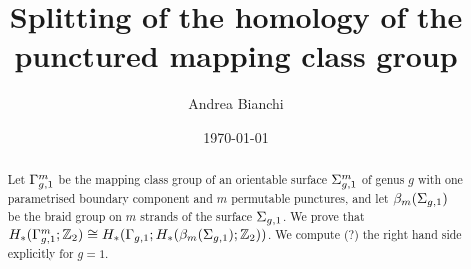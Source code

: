 \documentclass{amsart}
\theoremstyle{plain}
\theoremstyle{definition}
\begin{document}
\title{Splitting of the homology of the punctured mapping class group}

\author{Andrea Bianchi}

\address{Mathematics Institute,
University of Bonn,
Endenicher Allee 60, Bonn,
Germany
}




\date{\today}



\begin{abstract}
Let $\Gamma_{g,1}^m$ be the mapping class group of an orientable surface $\Sigma_{g,1}^m$ of genus $g$ with one parametrised
boundary component and $m$ permutable punctures, and let $\beta_{m}(\Sigma_{g,1})$ be the braid group on $m$ strands
of the surface $\Sigma_{g,1}$. We prove that $H_*(\Gamma_{g,1}^m;\mathbb{Z}_2)\cong H_*(\Gamma_{g,1};H_*(\beta_{m}(\Sigma_{g,1});\mathbb{Z}_2))$.
We compute (?) the right hand side explicitly for $g=1$.
\end{abstract}


\maketitle



















{}

\end{document}
